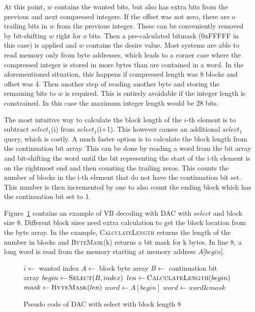 At this point, $w$ contains the wanted bits, but also has extra bits from the previous and next compressed integers. If the offset was not zero, there are $o$ trailing bits in $w$ from the previous integer. 
These can be conveniently removed by bit-shifting $w$ right for $o$ bits. Then a pre-calculated bitmask (0xFFFFF in this case) is applied and $w$ contains the desire value. Most systems are
able to read memory only from byte addresses, which leads to a corner case where the compressed integer is stored in more bytes than are contained in a word. In the aforementioned situation, this 
happens if compressed length was 8 blocks and offset was 4. Then another step of reading another byte and storing the remaining bits to $w$ is required. This is entirely avoidable if the integer 
length is constrained. In this case the maximum integer length would be 28 bits.

The most intuitive way to calculate the block length of the $i$-th element is to subtract $select_1$(i) from $select_1$(i+1). This however causes an additional 
$select_1$ query, which is costly. A much faster option is to calculate the block length from the continuation bit array. This can be done by reading a word from the bit array and bit-shifting the word 
until the bit representing the start of the i-th element is on the rightmost end and then counting the trailing zeros. This counts the number of blocks in the i-th element that do not have the continuation bit set. 
This number is then incremented by one to also count the ending block which has the continuation bit set to 1.
 
Figure~\ref{select_pseudo} contains an example of VB decoding with DAC with $select$ and block size 8. 
Different block sizes need extra calculation to get the block location from the byte array. In the example, \textsc{CalculateLength} returns the length of the number in blocks and \textsc{ByteMask}(k) returns 
a bit mask for k bytes. In line 8, a long word is read from the memory starting at memory address $A$[$begin$].

\begin{figure}[ht]
\centering
\begin{minipage}{0.5\linewidth}
\begin{algorithmic}[1]
\State $i \gets $ wanted index
\State $A \gets $ block byte array
\State $B \gets $ continuation bit array
\State $begin \gets \Call{Select}{B, index}$
\State $len \gets \Call{CalculateLength}{begin}$
\State $mask \gets \Call{ByteMask}{len}$
\State $word \gets A[begin]$
\State $word \gets word \mathbin{\&} mask$ 

\end{algorithmic}
\end{minipage}
\caption{Pseudo code of DAC with select with block length 8} \label{select_pseudo}
\end{figure}

